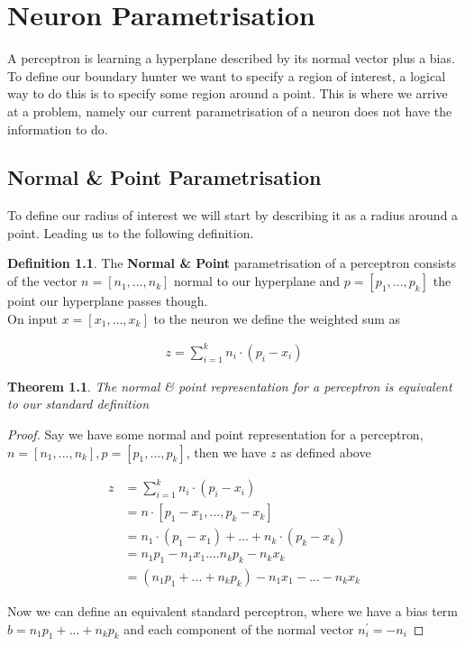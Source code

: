 \documentclass[notitlepage]{report}
\newtheorem{theorem}{Theorem}
\theoremstyle{definition}
\newtheorem{definition}{Definition}[section]
\begin{document}
\chapter{Neuron Parametrisation}
A perceptron is learning a hyperplane described by its normal vector plus a bias. To define our boundary hunter we want to specify a region of interest, a logical way to do this is to specify some region around a point. This is where we arrive at a problem, namely our current parametrisation of a neuron does not have the information to do.

\section{Normal \& Point Parametrisation}
To define our radius of interest we will start by describing it as a radius around a point. Leading us to the following definition.

\theoremstyle{definition}
\begin{definition}
	The \textbf{Normal \& Point} parametrisation of a perceptron consists of the vector $n = [n_1, ..., n_k]$ normal to our hyperplane and $p = [p_1, ..., p_k]$ the point our hyperplane passes though.\\
	
	On input $x = [x_1, ..., x_k]$ to the neuron we define the weighted sum as 
	
	\begin{align*}
	z = \sum_{i=1}^k n_i \cdot (p_i - x_i)
	\end{align*}
\end{definition}

\begin{theorem}
The normal \& point representation for a perceptron is equivalent to our standard definition
\end{theorem}

\begin{proof}
Say we have some normal and point representation for a perceptron, $n = [n_1, ..., n_k], p = [p_1, ..., p_k]$, then we have $z$ as defined above

\begin{align*}
z &= \sum_{i=1}^k n_i \cdot (p_i - x_i)\\
&= n \cdot [p_1 - x_1, ..., p_k - x_k]\\
&= n_1 \cdot (p_1 - x_1) + ... + n_k \cdot (p_k - x_k)\\
&= n_1p_1 - n_1x_1 .... n_kp_k - n_kx_k\\
&= (n_1p_1 + ... + n_kp_k) - n_1x_1 - ... - n_kx_k
\end{align*}

Now we can define an equivalent standard perceptron, where we have a bias term $b = n_1p_1 + ... + n_kp_k$ and each component of the normal vector $n^{'}_i = -n_i$

\end{proof}
\end{document}
